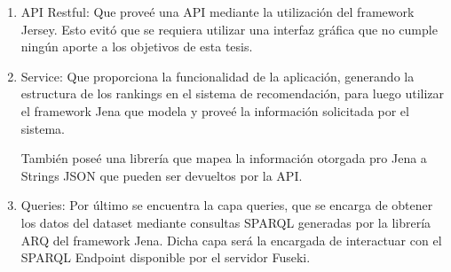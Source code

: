 \begin{enumerate}
 \item API Restful: Que proveé una API mediante la utilización del framework Jersey. Esto evitó 
 que se requiera utilizar una interfaz gráfica que no cumple ningún aporte a los objetivos de esta tesis.
 \item Service: Que proporciona la funcionalidad de la aplicación, generando la estructura de los 
 rankings en el sistema de recomendación, para luego utilizar el framework Jena que modela y proveé la información 
 solicitada por el sistema. 
 
 También poseé una librería que mapea la información otorgada pro Jena a Strings JSON que pueden ser 
 devueltos por la API.
 \item Queries: Por último se encuentra la capa queries, que se encarga de obtener los datos del dataset 
 mediante consultas SPARQL generadas por la librería ARQ del framework Jena. Dicha capa será la encargada 
 de interactuar con el SPARQL Endpoint disponible por el servidor Fuseki.
\end{enumerate}
